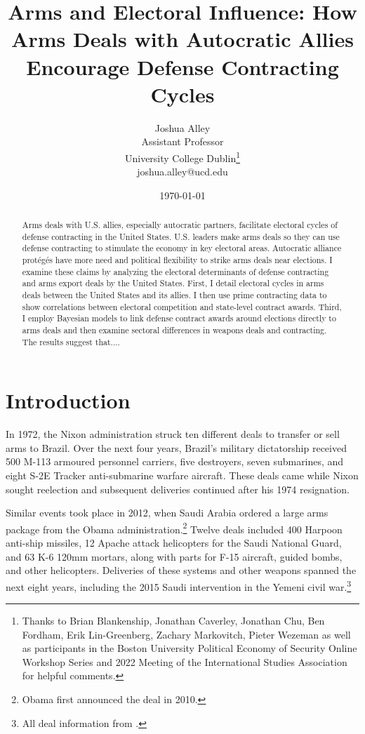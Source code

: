 \documentclass[12pt]{article}
\title{\textbf{Arms and Electoral Influence: How Arms Deals with Autocratic Allies Encourage Defense Contracting Cycles}}
\author{Joshua Alley \\
Assistant Professor \\
University College Dublin\thanks{Thanks to Brian Blankenship, Jonathan Caverley, Jonathan Chu, Ben Fordham, Erik Lin-Greenberg, Zachary Markovitch, Pieter Wezeman as well as participants in the Boston University Political Economy of Security Online Workshop Series and 2022 Meeting of the International Studies Association for helpful comments.} \\
joshua.alley@ucd.edu
}
\date{\today}
\begin{document}
\maketitle 

\begin{abstract} 
Arms deals with U.S. allies, especially autocratic partners, facilitate electoral cycles of defense contracting in the United States. 
U.S. leaders make arms deals so they can use defense contracting to stimulate the economy in key electoral areas.
Autocratic alliance prot{\'e}g{\'e}s have more need and political flexibility to strike arms deals near elections. 
I examine these claims by analyzing the electoral determinants of defense contracting and arms export deals by the United States. 
First, I  detail electoral cycles in arms deals between the United States and its allies. 
I then use prime contracting data to show correlations between electoral competition and state-level contract awards. 
Third, I employ Bayesian models to link defense contract awards around elections directly to arms deals and then examine sectoral differences in weapons deals and contracting.
The results suggest that.... 
\end{abstract} 


\newpage 
\doublespace 


\section{Introduction}



In 1972, the Nixon administration struck ten different deals to transfer or sell arms to Brazil.
Over the next four years, Brazil's military dictatorship received 500 M-113 armoured personnel carriers, five destroyers, seven submarines, and eight S-2E Tracker anti-submarine warfare aircraft.
These deals came while Nixon sought reelection and subsequent deliveries continued after his 1974 resignation. 


Similar events took place in 2012, when Saudi Arabia ordered a large arms package from the Obama administration.\footnote{Obama first announced the deal in 2010.} 
Twelve deals included 400 Harpoon anti-ship missiles, 12 Apache attack helicopters for the Saudi National Guard, and 63 K-6 120mm mortars, along with parts for F-15 aircraft, guided bombs, and other helicopters. 
Deliveries of these systems and other weapons spanned the next eight years, including the 2015 Saudi intervention in the Yemeni civil war.\footnote{All deal information from \citep{Sipri2022}.}
\end{document}
